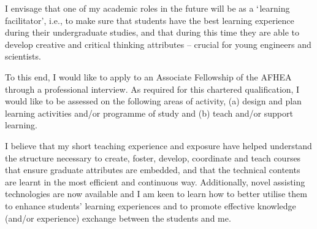 \documentclass[14pt,twoside]{article}
\begin{document}
I envisage that one of my academic roles in the future will be as a $\lq$learning facilitator', i.e., to make sure that students have the best learning experience during their undergraduate studies, and that during this time they are able to develop creative and critical thinking attributes -- crucial for young engineers and scientists. 

To this end, I would like to apply to an Associate Fellowship of the AFHEA through a professional interview. As required for this chartered qualification, I would like to be assessed on the following areas of activity, (a) design and plan learning activities and/or programme of study and (b) teach and/or support learning. 

I believe that my short teaching experience and exposure have helped understand the structure necessary to create, foster, develop, coordinate and teach courses that ensure graduate attributes are embedded, and that the technical contents are learnt in the most efficient and continuous way. Additionally, novel assisting technologies are now available and I am keen to learn how to better utilise them to enhance students' learning experiences and to promote effective knowledge (and/or experience) exchange between the students and me.
\end{document}
